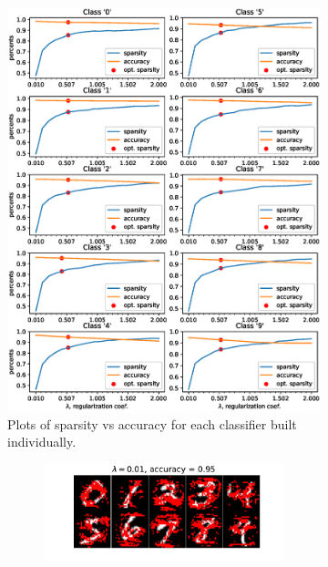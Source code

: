 \documentclass{article}
\begin{document}
\begin{figure}[t!]
    \label{fig:important_pixels}
    \begin{subfigure}[t!]{0.65\textwidth}
        \centering
        \includegraphics[width=\textwidth]{images/classifiers_ind_sparsity}
        \caption{Plots of sparsity vs accuracy for each classifier built individually. }
    \end{subfigure}%
    \begin{subfigure}[t!]{0.40\textwidth}
        \centering
        \begin{subfigure}{\textwidth}
            \centering
            \includegraphics[width=\textwidth]{images/pixels_with_background_0}

\end{subfigure}
\end{subfigure}
\end{figure}
\end{document}
